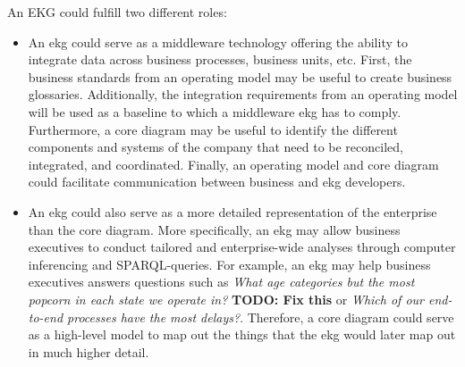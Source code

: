 %
%
An EKG could fulfill two different roles:

\begin{itemize}
    \item An \gls{ekg} could serve as a middleware technology offering the ability to integrate data across
          business processes, business units, etc.
          First, the business standards from an operating model may be useful to create business glossaries.
          Additionally, the integration requirements from an operating model will be used as a baseline to
          which a middleware \gls{ekg} has to comply.
          Furthermore, a core diagram may be useful to identify the different components and systems of
          the company that need to be reconciled, integrated, and coordinated.
          Finally, an operating model and core diagram could facilitate communication between business
          and \gls{ekg} developers.
    \item An \gls{ekg} could also serve as a more detailed representation of the enterprise than the core diagram.
          More specifically, an \gls{ekg} may allow business executives to conduct tailored and
          enterprise-wide analyses through computer inferencing and SPARQL-queries.
          For example, an \gls{ekg} may help business executives answers questions such as
          \textit{What age categories but the most popcorn in each state we operate in?} \textbf{TODO: Fix this} or
          \textit{Which of our end-to-end processes have the most delays?}.
          Therefore, a core diagram could serve as a high-level model to map out the things that the \gls{ekg}
          would later map out in much higher detail.
\end{itemize}


